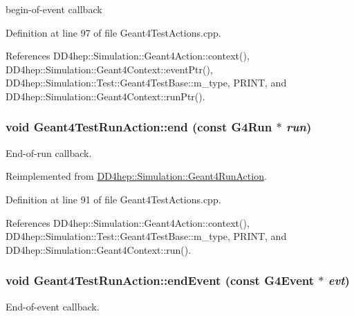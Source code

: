 begin-\/of-\/event callback 

Definition at line 97 of file Geant4TestActions.cpp.

References DD4hep::Simulation::Geant4Action::context(), DD4hep::Simulation::Geant4Context::eventPtr(), DD4hep::Simulation::Test::Geant4TestBase::m\_\-type, PRINT, and DD4hep::Simulation::Geant4Context::runPtr().\hypertarget{class_d_d4hep_1_1_simulation_1_1_test_1_1_geant4_test_run_action_a9cffefeecef4c952ad1fbbc80893aac8}{
\subsubsection[{end}]{\setlength{\rightskip}{0pt plus 5cm}void Geant4TestRunAction::end (const G4Run $\ast$ {\em run})}}
\label{class_d_d4hep_1_1_simulation_1_1_test_1_1_geant4_test_run_action_a9cffefeecef4c952ad1fbbc80893aac8}


End-\/of-\/run callback. 

Reimplemented from \hyperlink{class_d_d4hep_1_1_simulation_1_1_geant4_run_action_a71c7dbfb3451a9d6cc594f0174a631a2}{DD4hep::Simulation::Geant4RunAction}.

Definition at line 91 of file Geant4TestActions.cpp.

References DD4hep::Simulation::Geant4Action::context(), DD4hep::Simulation::Test::Geant4TestBase::m\_\-type, PRINT, and DD4hep::Simulation::Geant4Context::run().\hypertarget{class_d_d4hep_1_1_simulation_1_1_test_1_1_geant4_test_run_action_ae93d60ada35540e3801472025ff23ded}{
\subsubsection[{endEvent}]{\setlength{\rightskip}{0pt plus 5cm}void Geant4TestRunAction::endEvent (const G4Event $\ast$ {\em evt})}}
\label{class_d_d4hep_1_1_simulation_1_1_test_1_1_geant4_test_run_action_ae93d60ada35540e3801472025ff23ded}


End-\/of-\/event callback. 

